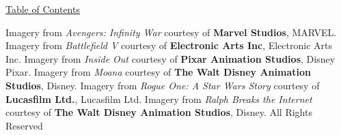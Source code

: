 \documentclass[a4paper]{report}
\begin{document}
\maketitle




\begin{center}
    \Large{\href{./cinematic-color.html}{Table of Contents}}
\end{center}

\noindent\footnotesize{
    Imagery from \textit{Avengers: Infinity War} courtesy of \textbf{Marvel Studios},  MARVEL.
    Imagery from \textit{Battlefield V} courtesy of \textbf{Electronic Arts Inc},  Electronic Arts Inc.
    Imagery from \textit{Inside Out} courtesy of \textbf{Pixar Animation Studios},  Disney \textbullet Pixar.
    Imagery from \textit{Moana} courtesy of \textbf{The Walt Disney Animation Studios},  Disney.
    Imagery from \textit{Rogue One: A Star Wars Story} courtesy of \textbf{Lucasfilm Ltd.},  Lucasfilm Ltd.
    Imagery from \textit{Ralph Breaks the Internet} courtesy of \textbf{The  Walt Disney Animation Studios},  Disney. All Rights Reserved
}
\end{document}

